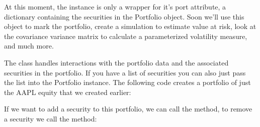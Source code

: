 \documentclass[letterpaper,10pt,english]{sphinxmanual}
\begin{document}
At this moment, the  instance is only a wrapper for
it’s port attribute, a dictionary containing the securities in the
Portfolio object. Soon we’ll use this object to mark the portfolio,
create a simulation to estimate value at risk, look at the covariance
variance matrix to calculate a parameterized volatility measure, and
much more.

The  class handles interactions with the portfolio data and
the associated securities in the portfolio. If you have a list of
securities you can also just pass the list into the Portfolio instance.
The following code creates a portfolio of just the AAPL equity that we
created earlier:

%
\begin{sphinxVerbatim}[commandchars=\\\{\}]
  \PYG{p}{[}\PYG{p}{]}
\end{sphinxVerbatim}

If we want to add a security to this portfolio, we can call the
 method, to remove a security we call the
 method:
\end{document}
